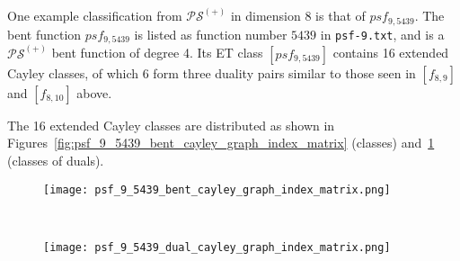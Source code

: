 
One example classification from $\mathcal{PS}^{(+)}$ in dimension 8 is that of $psf_{9,5439}$.
The bent function $psf_{9,5439}$ is listed as function number $5439$ in \texttt{psf-9.txt},
and is a $\mathcal{PS}^{(+)}$ bent function of degree 4.
Its ET class $[psf_{9,5439}]$ contains 16 extended Cayley classes,
of which 6 form three duality pairs similar to those seen in $[f_{8,9}]$ and $[f_{8,10}]$ above.

The 16 extended Cayley classes are distributed
as shown in Figures~\ref{fig:psf_9_5439_bent_cayley_graph_index_matrix} (classes) and~\ref{fig:psf_9_5439_dual_cayley_graph_index_matrix}
(classes of duals).

\begin{figure}[!ht] %
\centering
\begin{minipage}{.48\textwidth}
  \centering
  \texttt{[image: psf\_9\_5439\_bent\_cayley\_graph\_index\_matrix.png]}
  \label{fig:psf_9_5439_bent_cayley_graph_index_matrix}
\end{minipage}
~~
\begin{minipage}{.48\textwidth}
  \centering
  \texttt{[image: psf\_9\_5439\_dual\_cayley\_graph\_index\_matrix.png]}
  \label{fig:psf_9_5439_dual_cayley_graph_index_matrix}
\end{minipage}%
\end{figure}




\newpage





%
